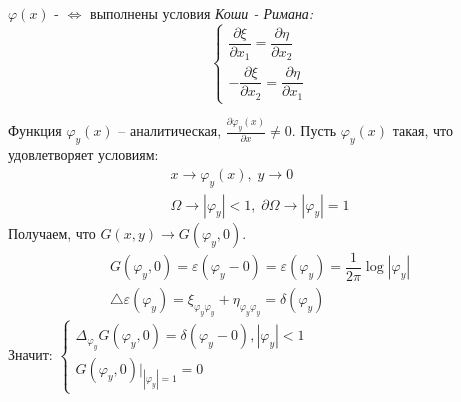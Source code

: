 \begin{definition}
	$ \varphi(x) $ -  $\Leftrightarrow$ выполнены условия \textit{Коши - Римана:} 
	$$\begin{cases}
		\dfrac{\partial \xi}{\partial x_1} = \dfrac{\partial \eta}{\partial x_2} \\
		-\dfrac{\partial \xi}{\partial x_2} = \dfrac{\partial \eta}{\partial x_1}
	\end{cases}$$
\end{definition}

Функция $ \varphi_y(x) $ -- аналитическая, $ \frac{\partial \varphi_y(x)}{\partial x} \neq 0. $ Пусть $ \varphi_y(x) $ такая, что удовлетворяет условиям:
$$\begin{gathered} 
	x \to \varphi_y(x), \; y \to 0 \\
	\Omega \to |\varphi_y| < 1, \; \partial\Omega \to |\varphi_y| = 1
\end{gathered}$$
Получаем, что $G(x, y) \to G(\varphi_y, 0)$.
$$\begin{gathered} 
	G(\varphi_y, 0) = \varepsilon(\varphi_y - 0) = \varepsilon(\varphi_y) = \dfrac{1}{2\pi}\log|\varphi_y| \\
	\triangle \varepsilon(\varphi_y) = \xi_{\varphi_y\varphi_y} + \eta_{\varphi_y\varphi_y} = \delta(\varphi_y)
\end{gathered}$$
Значит:
$\begin{cases}
	\displaystyle \Delta_{\varphi_y} G(\varphi_y, 0) = \delta(\varphi_y - 0), |\varphi_y| < 1 \\
	\displaystyle G(\varphi_y, 0)|_{|\varphi_y| = 1} = 0
\end{cases}$

